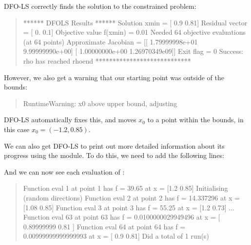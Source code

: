 \documentclass[letterpaper,10pt,english]{sphinxmanual}
\begin{document}
DFO-LS correctly finds the solution to the constrained problem:
\begin{quote}

\begin{sphinxVerbatim}[commandchars=\\\{\}]
****** DFO\PYGZhy{}LS Results ******
Solution xmin = [ 0.9   0.81]
Residual vector = [ 0.   0.1]
Objective value f(xmin) = 0.01
Needed 64 objective evaluations (at 64 points)
Approximate Jacobian = [[ \PYGZhy{}1.79999998e+01   9.99999990e+00]
 [ \PYGZhy{}1.00000000e+00  \PYGZhy{}1.26970349e\PYGZhy{}09]]
Exit flag = 0
Success: rho has reached rhoend
****************************
\end{sphinxVerbatim}
\end{quote}

However, we also get a warning that our starting point was outside of the bounds:
\begin{quote}

\begin{sphinxVerbatim}[commandchars=\\\{\}]
RuntimeWarning: x0 above upper bound, adjusting
\end{sphinxVerbatim}
\end{quote}

DFO-LS automatically fixes this, and moves \(x_0\) to a point within the bounds, in this case \(x_0=(-1.2,0.85)\).

We can also get DFO-LS to print out more detailed information about its progress using the  module. To do this, we need to add the following lines:
\begin{quote}

\begin{sphinxVerbatim}[commandchars=\\\{\}]
 
 

\end{sphinxVerbatim}
\end{quote}

And we can now see each evaluation of :
\begin{quote}

\begin{sphinxVerbatim}[commandchars=\\\{\}]
Function eval 1 at point 1 has f = 39.65 at x = [\PYGZhy{}1.2   0.85]
Initialising (random directions)
Function eval 2 at point 2 has f = 14.337296 at x = [\PYGZhy{}1.08  0.85]
Function eval 3 at point 3 has f = 55.25 at x = [\PYGZhy{}1.2   0.73]
...
Function eval 63 at point 63 has f = 0.0100000029949496 at x = [ 0.89999999  0.81      ]
Function eval 64 at point 64 has f = 0.00999999999999993 at x = [ 0.9   0.81]
Did a total of 1 run(s)
\end{sphinxVerbatim}
\end{quote}
\end{document}
